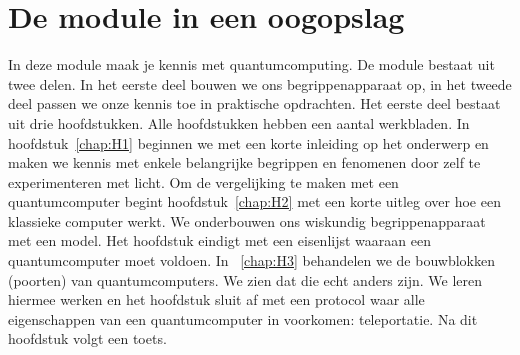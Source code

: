 \documentclass[../main.tex]{subfiles}
\begin{document}
\onlyinsubfile{
\setcounter{chapter}{0}
}
\notinsubfile{}

\section{De module in een oogopslag}\label{chap:Hoog}
In deze module maak je kennis met quantumcomputing. De module bestaat uit twee delen. In het eerste deel bouwen we ons begrippenapparaat op, in het tweede deel passen we onze kennis toe in praktische opdrachten. Het eerste deel bestaat uit drie hoofdstukken. Alle hoofdstukken hebben een aantal werkbladen. In hoofdstuk~\ref{chap:H1} beginnen we met een korte inleiding op het onderwerp en maken we kennis met enkele belangrijke begrippen en fenomenen door zelf te experimenteren met licht. Om de vergelijking te maken met een quantumcomputer begint hoofdstuk~\ref{chap:H2} met een korte uitleg over hoe een klassieke computer werkt. We onderbouwen ons wiskundig begrippenapparaat met een model. Het hoofdstuk eindigt met een eisenlijst waaraan een quantumcomputer moet voldoen. In ~\ref{chap:H3} behandelen we de bouwblokken (poorten) van quantumcomputers. We zien dat die echt anders zijn. We leren hiermee werken en het hoofdstuk sluit af met een protocol waar alle eigenschappen van een quantumcomputer in voorkomen: teleportatie. Na dit hoofdstuk volgt een toets. 
\end{document}
